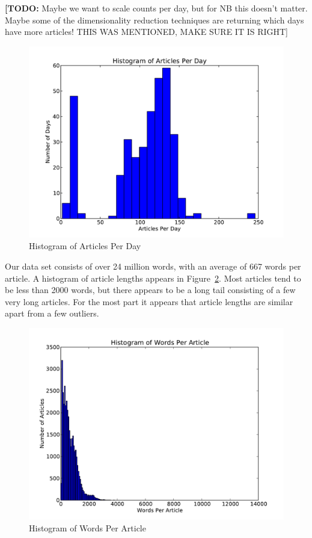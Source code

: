 \documentclass[10pt, twocolumn]{article}
\def\TODO#1{\noindent\textbf{[TODO:} #1]}
\begin{document}
\TODO{Maybe we want to scale counts per day, but for NB this doesn't matter. Maybe some of the dimensionality reduction techniques are returning which days have more articles! THIS WAS MENTIONED, MAKE SURE IT IS RIGHT}

\begin{figure}
\centering
\includegraphics[scale=0.3]{text/articleshist.pdf}
\caption{Histogram of Articles Per Day}

\label{articlehist}
\end{figure}

Our data set consists of over 24 million words, with an average of 667 words per article. A histogram of article lengths appears in Figure~\ref{wordshist}. Most articles tend to be less than 2000 words, but there appears to be a long tail consisting of a few very long articles. For the most part it appears that article lengths are similar apart from a few outliers.


\begin{figure}
\centering
\includegraphics[scale=0.3]{text/wordshist.pdf}
\caption{Histogram of Words Per Article}
\label{wordshist}
\end{figure}
\end{document}

